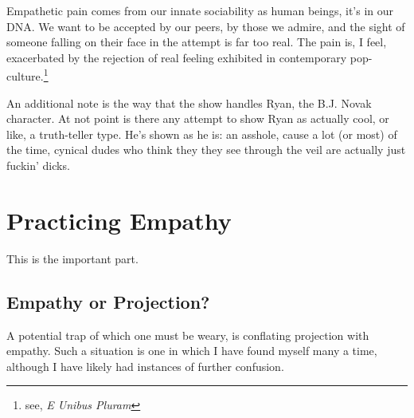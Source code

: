 \documentclass[../butidigress.tex]{subfiles}
\begin{document}
Empathetic pain comes from our innate sociability as human beings, it's in our DNA.
We want to be accepted by our peers, by those we admire, and the sight of someone falling on their face in the attempt is far too real.
The pain is, I feel, exacerbated by the rejection of real feeling exhibited in contemporary pop-culture.\footnote{see, \textit{E Unibus Pluram}}

An additional note is the way that the show handles Ryan, the B.J. Novak character.
At not point is there any attempt to show Ryan as actually cool, or like, a truth-teller type.
He's shown as he is: an asshole, cause a lot (or most) of the time, cynical dudes who think they they see through the veil are actually just fuckin' dicks.

\section{Practicing Empathy}
This is the important part.


\subsection{Empathy or Projection?}
A potential trap of which one must be weary, is conflating projection with empathy.
Such a situation is one in which I have found myself many a time, although I have likely had instances of further confusion.
\end{document}
